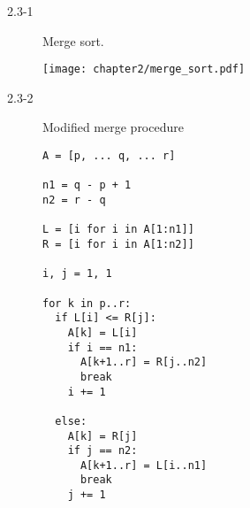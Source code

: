 \begin{description}
 \item[2.3-1] Merge sort.
 \begin{center}
 \texttt{[image: chapter2/merge\_sort.pdf]}
 \end{center}

\item[2.3-2] Modified merge procedure
\begin{lstlisting}
A = [p, ... q, ... r]

n1 = q - p + 1
n2 = r - q

L = [i for i in A[1:n1]]
R = [i for i in A[1:n2]]

i, j = 1, 1

for k in p..r:
  if L[i] <= R[j]:
    A[k] = L[i]
    if i == n1:
      A[k+1..r] = R[j..n2]
      break
    i += 1

  else:
    A[k] = R[j]
    if j == n2:
      A[k+1..r] = L[i..n1]
      break
    j += 1
\end{lstlisting}

\end{description}

